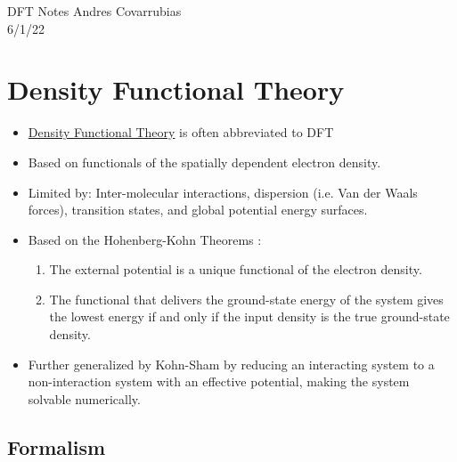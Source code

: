 \documentclass[12pt]{article}
\begin{document}
\noindent DFT Notes \hfill Andres Covarrubias    \\
6/1/22

\hrulefill
\tableofcontents
\newpage
\section{Density Functional Theory} %
\begin{itemize}
    \item \href{https://en.wikipedia.org/wiki/Density_functional_theory}{Density Functional Theory} is often abbreviated to DFT
    \item Based on functionals of the spatially dependent electron density.
    \item Limited by: Inter-molecular interactions, dispersion (i.e. Van der Waals forces), transition states, and global potential energy surfaces. 
    \item Based on the Hohenberg-Kohn Theorems \cite{HKt1}:
    \begin{enumerate}
        \item The external potential is a unique functional of the electron density.
        \item The functional that delivers the ground-state energy of the system gives the lowest energy if and only if the input density is the true ground-state density.
    \end{enumerate}
    \item Further generalized by Kohn-Sham \cite{KSeq} by reducing an interacting system to a non-interaction system with an effective potential, making the system solvable numerically. 
\end{itemize}

\subsection{Formalism} %
\end{document}
